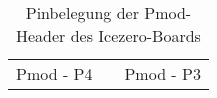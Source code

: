 \begin{table}[h]
{\begin{tabular}{lllllllclllll}
\multicolumn{6}{c}{Pmod - P4}                                                                                                                                                                                                                                                                                                                            &                       & \multicolumn{6}{c}{Pmod - P3}                                                                                                                                                                                                                                                                                                                      
\end{tabular}

}
\caption{Pinbelegung der Pmod-Header des Icezero-Boards}
\label{tbl:Pmod-Pins}
\end{table}


